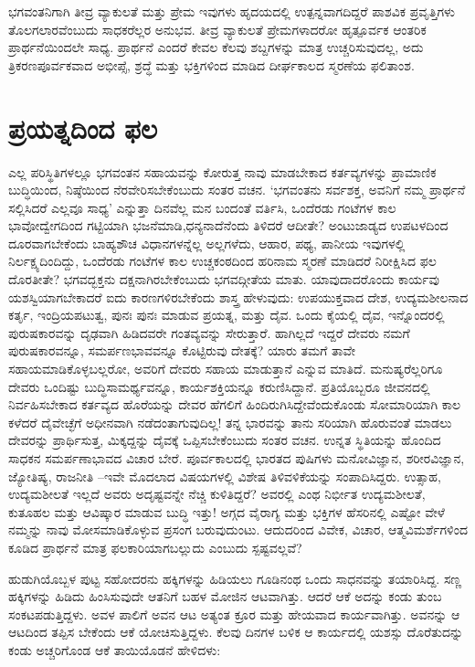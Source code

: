ಭಗವಂತನಿಗಾಗಿ ತೀವ್ರ ವ್ಯಾಕುಲತೆ ಮತ್ತು ಪ್ರೇಮ ಇವುಗಳು ಹೃದಯದಲ್ಲಿ ಉತ್ಪನ್ನವಾಗದಿದ್ದರೆ ಪಾಶವಿಕ ಪ್ರವೃತ್ತಿಗಳು ತೊಲಗಲಾರವೆಂಬುದು ಸಾಧಕರೆಲ್ಲರ ಅನುಭವ. ತೀವ್ರ ವ್ಯಾಕುಲತೆ ಪ್ರೇಮಗಳಾದರೋ ಹೃತ್ಪೂರ್ವಕ ಆಂತರಿಕ ಪ್ರಾರ್ಥನೆಯಿಂದಲೇ ಸಾಧ್ಯ. ಪ್ರಾರ್ಥನೆ ಎಂದರೆ ಕೇವಲ ಕೆಲವು ಶಬ್ದಗಳನ್ನು ಮಾತ್ರ ಉಚ್ಚರಿಸುವುದಲ್ಲ, ಅದು ತ್ರಿಕರಣಪೂರ್ವಕವಾದ ಅಭೀಪ್ಸೆ, ಶ್ರದ್ಧೆ ಮತ್ತು ಭಕ್ತಿಗಳಿಂದ ಮಾಡಿದ ದೀರ್ಘಕಾಲದ ಸ್ಮರಣೆಯ ಫಲಿತಾಂಶ.


\section{ಪ್ರಯತ್ನದಿಂದ ಫಲ}

ಎಲ್ಲ ಪರಿಸ್ಥಿತಿಗಳಲ್ಲೂ ಭಗವಂತನ ಸಹಾಯವನ್ನು ಕೋರುತ್ತ ನಾವು ಮಾಡಬೇಕಾದ ಕರ್ತವ್ಯಗಳನ್ನು ಪ್ರಾಮಾಣಿಕ ಬುದ್ಧಿಯಿಂದ, ನಿಷ್ಠೆಯಿಂದ ನೆರವೇರಿಸಬೇಕೆಂಬುದು ಸಂತರ ವಚನ. ‘ಭಗವಂತನು ಸರ್ವಶಕ್ತ, ಅವನಿಗೆ ನಮ್ಮ ಪ್ರಾರ್ಥನೆ ಸಲ್ಲಿಸಿದರೆ ಎಲ್ಲವೂ ಸಾಧ್ಯ’ ಎನ್ನುತ್ತಾ ದಿನವೆಲ್ಲ ಮನ ಬಂದಂತೆ ವರ್ತಿಸಿ, ಒಂದೆರಡು ಗಂಟೆಗಳ ಕಾಲ ಭಾವೋದ್ವೇಗದಿಂದ ಗಟ್ಟಿಯಾಗಿ ಭಜನೆಮಾಡಿ,ಧನ್ಯನಾದೆನೆಂದು ತಿಳಿದರೆ ಆದೀತೇ? ಅಂಟುಜಾಡ್ಯದ ಉಪಟಳದಿಂದ ದೂರವಾಗಬೇಕೆಂದು ಬಾಹ್ಯಶೌಚ ವಿಧಾನಗಳನ್ನೆಲ್ಲ ಅಲ್ಲಗಳೆದು, ಆಹಾರ, ಪಥ್ಯ, ಪಾನೀಯ ಇವುಗಳಲ್ಲಿ ನಿರ್ಲಕ್ಷ್ಯದಿಂದಿದ್ದು, ಒಂದೆರಡು ಗಂಟೆಗಳ ಕಾಲ ಉಚ್ಚಕಂಠದಿಂದ ಹರಿನಾಮ ಸ್ಮರಣೆ ಮಾಡಿದರೆ ನಿರೀಕ್ಷಿಸಿದ ಫಲ ದೊರತೀತೇ? ಭಗವದ್ಭಕ್ತನು ದಕ್ಷನಾಗಿರಬೇಕೆಂಬುದು ಭಗವದ್ಗೀತೆಯ ಮಾತು. ಯಾವುದಾದರೊಂದು ಕಾರ್ಯವು ಯಶಸ್ವಿಯಾಗಬೇಕಾದರೆ ಐದು ಕಾರಣಗಳಿರಬೇಕೆಂದು ಶಾಸ್ತ್ರ ಹೇಳುವುದು: ಉಪಯುಕ್ತವಾದ ದೇಶ, ಉದ್ಯಮಶೀಲನಾದ ಕರ್ತೃ, ಇಂದ್ರಿಯಪಟುತ್ವ, ಪುನಃ ಪುನಃ ಮಾಡುವ ಪ್ರಯತ್ನ, ಮತ್ತು ದೈವ. ಒಂದು ಕೈಯಲ್ಲಿ ದೈವ, ಇನ್ನೊಂದರಲ್ಲಿ ಪುರುಷಕಾರವನ್ನು ದೃಢವಾಗಿ ಹಿಡಿದವರೇ ಗಂತವ್ಯವನ್ನು ಸೇರುತ್ತಾರೆ. ಹಾಗಿಲ್ಲದೆ ಇದ್ದರೆ ದೇವರು ನಮಗೆ ಪುರುಷಕಾರವನ್ನೂ, ಸಮರ್ಪಣಭಾವವನ್ನೂ ಕೊಟ್ಟಿರುವು ದೇತಕ್ಕೆ? ಯಾರು ತಮಗೆ ತಾವೇ ಸಹಾಯಮಾಡಿಕೊಳ್ಳಬಲ್ಲರೋ, ಅವರಿಗೆ ದೇವರು ಸಹಾಯ ಮಾಡುತ್ತಾನೆ ಎನ್ನುವ ಮಾತಿದೆ. ಮನುಷ್ಯರೆಲ್ಲರಿಗೂ ದೇವರು ಒಂದಿಷ್ಟು ಬುದ್ಧಿಸಾಮರ್ಥ್ಯವನ್ನೂ, ಕಾರ್ಯಶಕ್ತಿಯನ್ನೂ ಕರುಣಿಸಿದ್ದಾನೆ. ಪ್ರತಿಯೊಬ್ಬರೂ ಜೀವನದಲ್ಲಿ ನಿರ್ವಹಿಸಬೇಕಾದ ಕರ್ತವ್ಯದ ಹೊರೆಯನ್ನು ದೇವರ ಹೆಗಲಿಗೆ ಹಿಂದಿರುಗಿಸಿದ್ದೇವೆಂದುಕೊಂಡು ಸೋಮಾರಿಯಾಗಿ ಕಾಲ ಕಳೆದರೆ ದೈವೇಚ್ಛೆಗೆ ಅಧೀನವಾಗಿ ನಡೆದಂತಾಗುವುದಿಲ್ಲ! ತನ್ನ ಭಾರವನ್ನು ತಾನು ಸರಿಯಾಗಿ ಹೊರುವಂತೆ ಮಾಡಲು ದೇವರನ್ನು ಪ್ರಾರ್ಥಿಸುತ್ತ, ಮಿಕ್ಕದ್ದನ್ನು ದೈವಕ್ಕೆ ಒಪ್ಪಿಸಬೇಕೆಂಬುದು ಸಂತರ ವಚನ. ಉನ್ನತ ಸ್ಥಿತಿಯನ್ನು ಹೊಂದಿದ ಸಾಧಕನ ಸಮರ್ಪಣಾಭಾವದ ವಿಚಾರ ಬೇರೆ. ಪೂರ್ವಕಾಲದಲ್ಲಿ ಭಾರತದ ಪುಷಿಗಳು ಮನೋವಿಜ್ಞಾನ, ಶರೀರವಿಜ್ಞಾನ, ಜ್ಯೋತಿಷ್ಯ, ರಾಜನೀತಿ –ಇವೇ ಮೊದಲಾದ ವಿಷಯಗಳಲ್ಲಿ ವಿಶೇಷ ತಿಳಿವಳಿಕೆಯನ್ನು ಸಂಪಾದಿಸಿದ್ದರು. ಉತ್ಸಾಹ, ಉದ್ಯಮಶೀಲತೆ ಇಲ್ಲದೆ ಅವರು ಅದೃಷ್ಟವನ್ನೇ ನೆಚ್ಚಿ ಕುಳಿತಿದ್ದರೆ? ಅವರಲ್ಲಿ ಎಂಥ ನಿರ್ಭೀತ ಉದ್ಯಮಶೀಲತೆ, ಕುತೂಹಲ ಮತ್ತು ಆವಿಷ್ಕಾರ ಮಾಡುವ ಬುದ್ಧಿ ಇತ್ತು! ಅಗ್ಗದ ವೈರಾಗ್ಯ ಮತ್ತು ಭಕ್ತಿಗಳ ಹೆಸರಿನಲ್ಲಿ ಎಷ್ಟೋ ವೇಳೆ ನಮ್ಮನ್ನು ನಾವು ಮೋಸಮಾಡಿಕೊಳ್ಳುವ ಪ್ರಸಂಗ ಬರುವುದುಂಟು. ಆದುದರಿಂದ ವಿವೇಕ, ವಿಚಾರ, ಆತ್ಮವಿಮರ್ಶೆಗಳಿಂದ ಕೂಡಿದ ಪ್ರಾರ್ಥನೆ ಮಾತ್ರ ಫಲಕಾರಿಯಾಗಬಲ್ಲುದು ಎಂಬುದು ಸ್ಪಷ್ಟವಲ್ಲವೆ?

ಹುಡುಗಿಯೊಬ್ಬಳ ಪುಟ್ಟ ಸಹೋದರನು ಹಕ್ಕಿಗಳನ್ನು ಹಿಡಿಯಲು ಗೂಡಿನಂಥ ಒಂದು ಸಾಧನವನ್ನು ತಯಾರಿಸಿದ್ದ. ಸಣ್ಣ ಹಕ್ಕಿಗಳನ್ನು ಹಿಡಿದು ಹಿಂಸಿಸುವುದೇ ಆತನಿಗೆ ಬಹಳ ಮೋಜಿನ ಆಟವಾಗಿತ್ತು. ಆದರೆ ಆಕೆ ಅದನ್ನು ಕಂಡು ತುಂಬ ಸಂಕಟಪಡುತ್ತಿದ್ದಳು. ಅವಳ ಪಾಲಿಗೆ ಅವನ ಆಟ ಅತ್ಯಂತ ಕ್ರೂರ ಮತ್ತು ಹೇಯವಾದ ಕಾರ್ಯವಾಗಿತ್ತು. ಅವನನ್ನು ಆ ಆಟದಿಂದ ತಪ್ಪಿಸ ಬೇಕೆಂದು ಆಕೆ ಯೋಚಿಸುತ್ತಿದ್ದಳು. ಕೆಲವು ದಿನಗಳ ಬಳಿಕ ಆ ಕಾರ್ಯದಲ್ಲಿ ಯಶಸ್ಸು ದೊರೆತುದನ್ನು ಕಂಡು ಅಚ್ಚರಿಗೊಂಡ ಆಕೆ ತಾಯಿಯೊಡನೆ ಹೇಳಿದಳು:

